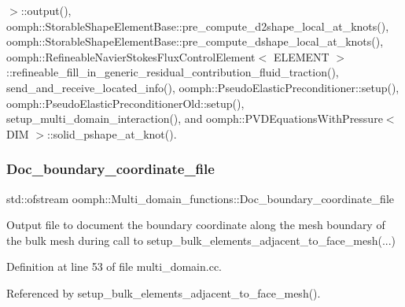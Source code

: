 $>$\+::output(), oomph\+::\+Storable\+Shape\+Element\+Base\+::pre\+\_\+compute\+\_\+d2shape\+\_\+local\+\_\+at\+\_\+knots(), oomph\+::\+Storable\+Shape\+Element\+Base\+::pre\+\_\+compute\+\_\+dshape\+\_\+local\+\_\+at\+\_\+knots(), oomph\+::\+Refineable\+Navier\+Stokes\+Flux\+Control\+Element$<$ E\+L\+E\+M\+E\+N\+T $>$\+::refineable\+\_\+fill\+\_\+in\+\_\+generic\+\_\+residual\+\_\+contribution\+\_\+fluid\+\_\+traction(), send\+\_\+and\+\_\+receive\+\_\+located\+\_\+info(), oomph\+::\+Pseudo\+Elastic\+Preconditioner\+::setup(), oomph\+::\+Pseudo\+Elastic\+Preconditioner\+Old\+::setup(), setup\+\_\+multi\+\_\+domain\+\_\+interaction(), and oomph\+::\+P\+V\+D\+Equations\+With\+Pressure$<$ D\+I\+M $>$\+::solid\+\_\+pshape\+\_\+at\+\_\+knot().

\mbox{\label{namespaceoomph_1_1Multi__domain__functions_a87a54c04fcc68b716adf10ca29a1f449}} 
\subsubsection{\texorpdfstring{Doc\+\_\+boundary\+\_\+coordinate\+\_\+file}{Doc\_boundary\_coordinate\_file}}
{\footnotesize\ttfamily std\+::ofstream oomph\+::\+Multi\+\_\+domain\+\_\+functions\+::\+Doc\+\_\+boundary\+\_\+coordinate\+\_\+file}



Output file to document the boundary coordinate along the mesh boundary of the bulk mesh during call to setup\+\_\+bulk\+\_\+elements\+\_\+adjacent\+\_\+to\+\_\+face\+\_\+mesh(...) 



Definition at line 53 of file multi\+\_\+domain.\+cc.



Referenced by setup\+\_\+bulk\+\_\+elements\+\_\+adjacent\+\_\+to\+\_\+face\+\_\+mesh().

\mbox{\label{namespaceoomph_1_1Multi__domain__functions_aa5969c7c730e13e9d5a2c268f3045203}} 
